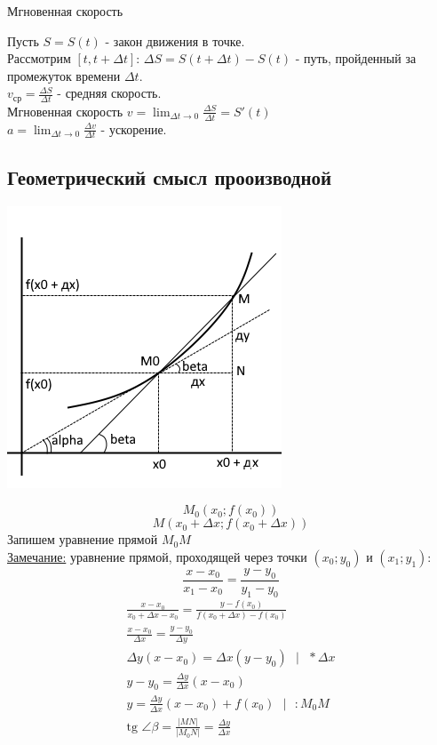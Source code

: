 \documentclass[12pt]{article}
\begin{document}
    \noindent Мгновенная скорость\par\noindent
    Пусть $S = S(t)$ - закон движения в точке.\\
    Рассмотрим $[ t, t + \Delta t ]$: $\Delta S = S(t+\Delta t) - S(t)$ - путь, пройденный за промежуток времени $\Delta t$.\\
    $v_{\text{ср}} = \frac{\Delta S}{\Delta t}$ - средняя скорость.\\
    Мгновенная скорость $v = \lim_{\Delta t \to 0} \frac{\Delta S}{\Delta t} = S'(t)$\\
    $a = \lim_{\Delta t \to 0} \frac{\Delta v}{\Delta t}$ - ускорение.

    \subsection{Геометрический смысл прооизводной}
    \begin{center}
        \includegraphics{4.2.1.png}
    \end{center}
    \[ M_0(x_0; f(x_0)) \]
    \[ M(x_0 + \Delta x; f(x_0 + \Delta x)) \]
    Запишем уравнение прямой $M_0M$\\
    \underline{Замечание:} уравнение прямой, проходящей через точки $(x_0; y_0)$ и $(x_1; y_1)$:
    \[ \frac{x - x_0}{x_1 - x_0} = \frac{y - y_0}{y_1 - y_0} \]
    \begin{gather*}
        \frac{x - x_0}{x_0 + \Delta x - x_0} = \frac{y - f(x_0)}{f(x_0 + \Delta x) - f(x_0)}\\
        \frac{x - x_0}{\Delta x} = \frac{y - y_0}{\Delta y}\\
        \Delta y(x - x_0) = \Delta x(y - y_0) \text{ } \big| \text{ } * \Delta x\\
        y - y_0 = \frac{\Delta y}{\Delta x}(x - x_0)\\
        y = \frac{\Delta y}{\Delta x}(x - x_0) + f(x_0) \text{ } \big| \text{ } : M_0M\\
        \text{tg } \angle \beta = \frac{|MN|}{|M_0N|} = \frac{\Delta y}{\Delta x}
    \end{gather*}
\end{document}
